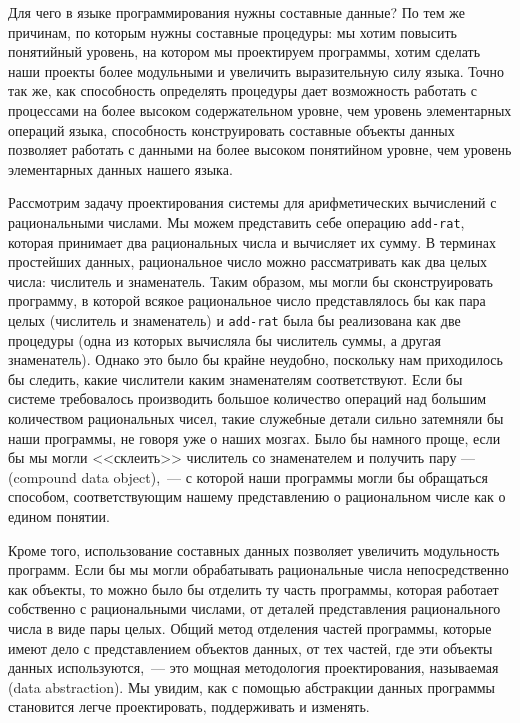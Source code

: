Для чего в языке программирования нужны составные данные? По
тем же причинам, по которым нужны составные процедуры: мы хотим
повысить понятийный уровень, на котором мы проектируем
программы, хотим сделать наши проекты более модульными и увеличить
выразительную силу языка.  Точно так же, как способность
определять процедуры дает возможность работать с процессами на
более высоком содержательном уровне, чем уровень элементарных операций
языка, способность конструировать составные объекты данных
позволяет работать с данными на более высоком понятийном уровне, 
чем уровень элементарных данных нашего языка.

%
Рассмотрим задачу проектирования системы для арифметических
вычислений с рациональными числами.  Мы можем представить себе
операцию {\tt add-rat}, которая принимает два рациональных
числа и вычисляет их сумму.  В терминах простейших данных, рациональное 
число можно рассматривать как два целых числа: числитель и
знаменатель.  Таким образом, мы могли бы сконструировать программу, в
которой всякое рациональное число представлялось бы как пара целых
(числитель и знаменатель) и {\tt add-rat} была бы реализована
как две процедуры (одна из которых вычисляла бы числитель суммы, а
другая знаменатель).  Однако это было бы крайне неудобно, поскольку
нам приходилось бы следить, какие числители каким знаменателям
соответствуют.  Если бы системе требовалось производить
большое количество операций над большим количеством рациональных
чисел, такие служебные детали сильно затемняли бы наши
программы, не говоря уже о наших мозгах.  Было бы намного проще,
если бы мы могли <<склеить>> числитель со знаменателем и получить пару 
---  (compound data object),~--- с которой наши программы могли бы обращаться
способом, соответствующим нашему представлению о рациональном числе как о
едином понятии.

Кроме того, использование составных данных позволяет
увеличить модульность программ.  Если бы мы могли обрабатывать
рациональные числа непосредственно как объекты, то можно было бы отделить ту
часть программы, которая работает собственно с рациональными
числами, от деталей представления рационального числа в
виде пары целых.   Общий метод отделения частей программы, которые
имеют дело с представлением объектов данных, от тех частей,
где эти объекты данных используются,~--- это мощная методология
проектирования, называемая  (data abstraction).  Мы увидим, как с помощью абстракции данных программы
становится легче проектировать, поддерживать и изменять.

